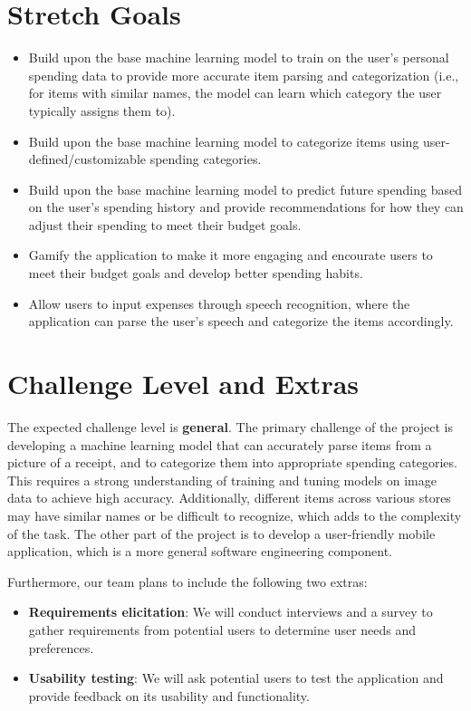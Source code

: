 \documentclass{article}
\begin{document}
\section{Stretch Goals}
\begin{itemize}
    \item Build upon the base machine learning model to train on the user's
    personal spending data to provide more accurate item parsing and
    categorization (i.e., for items with similar names, the model can learn
    which category the user typically assigns them to).
    \item Build upon the base machine learning model to categorize items using
    user-defined/customizable spending categories.
    \item Build upon the base machine learning model to predict future spending
    based on the user's spending history and provide recommendations for how
    they can adjust their spending to meet their budget goals.
    \item Gamify the application to make it more engaging and encourate users to
    meet their budget goals and develop better spending habits.
    \item Allow users to input expenses through speech recognition, where the
    application can parse the user's speech and categorize the items
    accordingly.
\end{itemize}

\section{Challenge Level and Extras}

The expected challenge level is \textbf{general}. The primary challenge of the
project is developing a machine learning model that can accurately parse items
from a picture of a receipt, and to categorize them into appropriate spending
categories. This requires a strong understanding of training and tuning models
on image data to achieve high accuracy. Additionally, different items across
various stores may have similar names or be difficult to recognize, which adds
to the complexity of the task. The other part of the project is to develop a
user-friendly mobile application, which is a more general software engineering
component.

Furthermore, our team plans to include the following two extras:
\begin{itemize}
    \item \textbf{Requirements elicitation}: We will conduct interviews and a
    survey to gather requirements from potential users to determine user needs
    and preferences.
    \item \textbf{Usability testing}: We will ask potential users to test the
    application and provide feedback on its usability and functionality.

\end{itemize}
\end{document}
